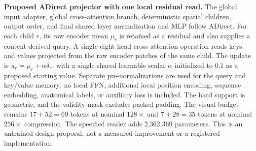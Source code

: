\caption{\textbf{Proposed ADirect projector with one local residual read.}
The global input adapter, global cross-attention branch, deterministic spatial
children, output order, and final shared layer normalization and MLP follow
ADirect. For each child $r$, its raw encoder mean $\mu_r$ is retained as a
residual and also supplies a content-derived query. A single eight-head
cross-attention operation reads keys and values projected from the raw
encoder patches of the same child. The update is
$u_r=\mu_r+\alpha\delta_r$, with a single shared learnable scalar $\alpha$
initialized to $0.1$ as a proposed starting value. Separate pre-normalizations
are used for the query and key/value memory; no local FFN, additional local
position encoding, sequence embedding, anatomical labels, or auxiliary loss
is included. The hard support is geometric, and the validity mask excludes
packed padding. The visual budget remains $17+52=69$ tokens at nominal
$128\times$ and $7+28=35$ tokens at nominal $256\times$ compression.
The specified reader adds 2,362,369 parameters. This is an untrained design
proposal, not a measured improvement or a registered implementation.}
\label{fig:adirect-localread-proposal}
